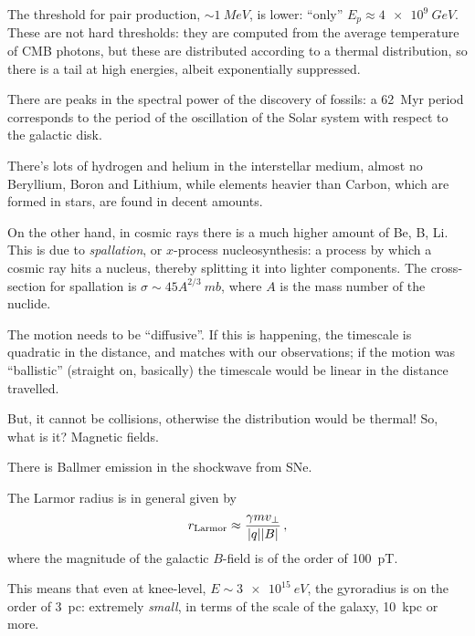 \documentclass[main.tex]{subfiles}
\begin{document}
The threshold for pair production, \(\sim \SI{1}{MeV}\), is lower: ``only'' \(E_p \approx \SI{4e9}{GeV}\). 
These are not hard thresholds: they are computed from the 
average temperature of CMB photons, but these are distributed according to a thermal distribution, so there is a tail at high energies, albeit exponentially suppressed. 

There are peaks in the spectral power of the discovery of fossils: 
a \SI{62}{Myr} period corresponds to the period of the oscillation of the Solar system 
with respect to the galactic disk. 


There's lots of hydrogen and helium in the interstellar medium, 
almost no Beryllium, Boron and Lithium, 
while elements heavier than Carbon, which are formed in stars, are found in decent amounts.

On the other hand, in cosmic rays there is a much higher amount of Be, B, Li.
This is due to \emph{spallation}, or \(x\)-process nucleosynthesis: a process by which a cosmic ray hits a nucleus, thereby splitting it into lighter components. 
The cross-section for spallation is \(\sigma \sim 45 A^{2/3} \SI{}{mb}\), where \(A\) is the mass number of the nuclide.

The motion needs to be ``diffusive''.
If this is happening, the timescale is quadratic in the distance, and matches with our observations; if the motion
was ``ballistic'' (straight on, basically) the timescale would be linear in the distance travelled. 


But, it cannot be collisions, otherwise the distribution would be thermal! So, what is it?
Magnetic fields. 

There is Ballmer emission in the shockwave from SNe. 

The Larmor radius is in general given by 
%
\begin{align}
r _{\text{Larmor}} \approx \frac{\gamma m v_\perp}{\abs{q} \abs{B}}
\,,
\end{align}
%
where the magnitude of the galactic \(B\)-field is of the order of \SI{100}{pT}.


This means that even at knee-level, \(E \sim \SI{3e15}{eV}\), the gyroradius is on the order of \SI{3}{pc}: extremely \emph{small}, in terms of the scale of the galaxy, \SI{10}{kpc} or more.
\end{document}
